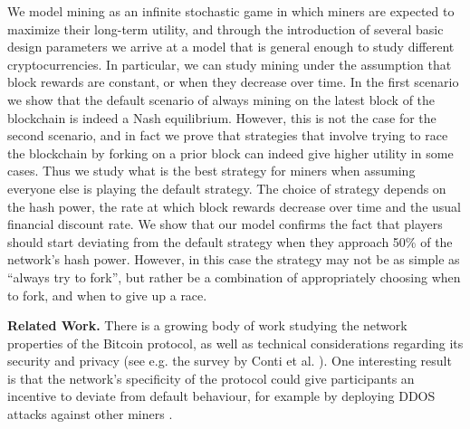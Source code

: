 We model mining as an infinite stochastic game in which miners are expected to maximize their long-term utility, and through the introduction of several 
basic design parameters we arrive at a model that is general enough to study different cryptocurrencies. In particular, we can study mining under the assumption that block rewards are constant, or when they decrease over time. In the first scenario we show that 
the default scenario of always mining on the latest block of the blockchain is indeed a Nash equilibrium. However, this is not the case for the second scenario, and in fact we 
prove that strategies that involve trying to race the blockchain by forking on a prior block can indeed give higher utility in some cases. Thus we study 
what is the best strategy for miners when assuming everyone else is playing the default strategy. The choice of strategy depends on the hash power, the rate at which 
block rewards decrease over time and the usual financial discount rate. We show that our model confirms the fact that players should start deviating from the default strategy 
when they approach 50\% of the network's hash power. However, in this case the strategy may not be as simple as ``always try to fork'', but rather be a combination 
of appropriately choosing when to fork, and when to give up a race. 



\smallskip
\noindent
{\bf Related Work.} There is a growing body of work studying the network properties of the Bitcoin protocol, as well as technical considerations regarding its security and privacy (see e.g. the survey by Conti et al. \cite{conti2018survey}). One interesting result is that the network's specificity of the protocol could give participants an incentive to deviate from default behaviour, for example by deploying DDOS attacks against other miners \cite{bitcoin_attacks_2013,ddos_attacks2014,empirical_dos_attacks2014}. 

